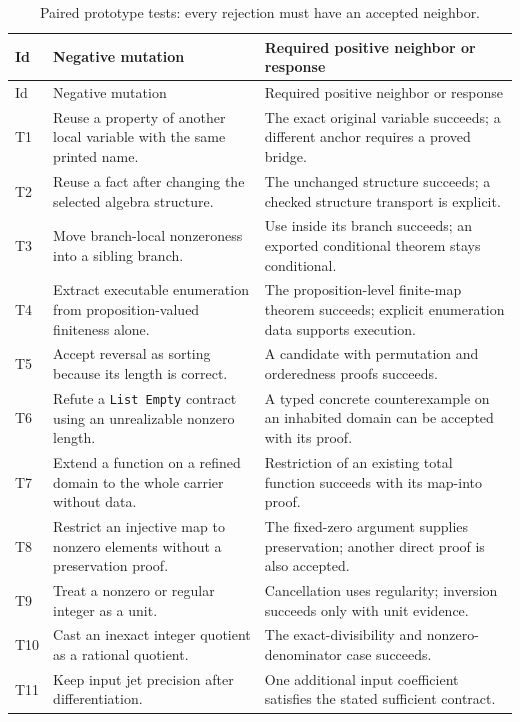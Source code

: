 \documentclass[11pt,letterpaper]{article}
\newcommand{\code}[1]{\nolinkurl{#1}}
\theoremstyle{remark}
\begin{document}
\small
\begin{longtable}{@{}P{.35in}P{2.60in}P{3.05in}@{}}
\caption{Paired prototype tests: every rejection must have an accepted neighbor.}\label{tab:mutations}\\
\toprule
Id & Negative mutation & Required positive neighbor or response\\
\midrule
\endfirsthead
\toprule Id & Negative mutation & Required positive neighbor or response\\\midrule
\endhead
T1 & Reuse a property of another local variable with the same printed name.
& The exact original variable succeeds; a different anchor requires a proved bridge.\\
T2 & Reuse a fact after changing the selected algebra structure.
& The unchanged structure succeeds; a checked structure transport is explicit.\\
T3 & Move branch-local nonzeroness into a sibling branch.
& Use inside its branch succeeds; an exported conditional theorem stays conditional.\\
T4 & Extract executable enumeration from proposition-valued finiteness alone.
& The proposition-level finite-map theorem succeeds; explicit enumeration data supports execution.\\
T5 & Accept reversal as sorting because its length is correct.
& A candidate with permutation and orderedness proofs succeeds.\\
T6 & Refute a \code{List Empty} contract using an unrealizable nonzero length.
& A typed concrete counterexample on an inhabited domain can be accepted with its proof.\\
T7 & Extend a function on a refined domain to the whole carrier without data.
& Restriction of an existing total function succeeds with its map-into proof.\\
T8 & Restrict an injective map to nonzero elements without a preservation proof.
& The fixed-zero argument supplies preservation; another direct proof is also accepted.\\
T9 & Treat a nonzero or regular integer as a unit.
& Cancellation uses regularity; inversion succeeds only with unit evidence.\\
T10 & Cast an inexact integer quotient as a rational quotient.
& The exact-divisibility and nonzero-denominator case succeeds.\\
T11 & Keep input jet precision after differentiation.
& One additional input coefficient satisfies the stated sufficient contract.\\

\end{longtable}
\end{document}
